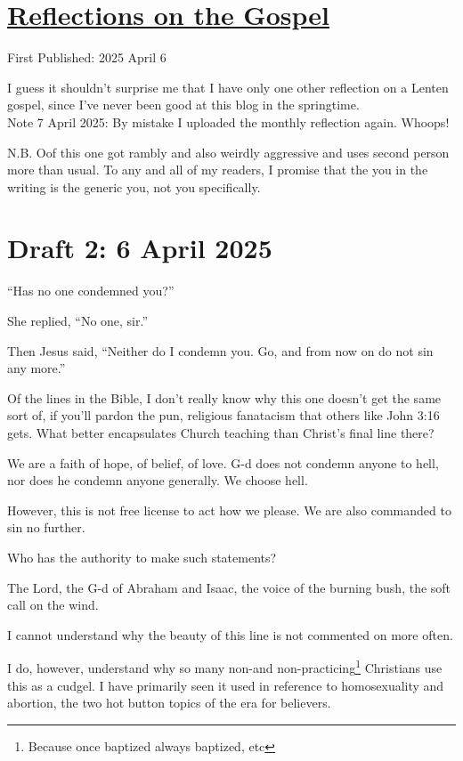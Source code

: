 \documentclass[12pt]{article}[titlepage]
\newcommand{\say}[1]{``#1''}
\renewcommand{\,}{\textsuperscript{,}}
\begin{document}
\doublespacing
\section{\href{reflections-on-readings-5-lent-c-25.html}{Reflections on the Gospel}}
First Published: 2025 April 6

I guess it shouldn't surprise me that I have only one other reflection on a Lenten gospel, since I've never been good at this blog in the springtime.
\\Note 7 April 2025: By mistake I uploaded the monthly reflection again.
Whoops!


N.B. Oof this one got rambly and also weirdly aggressive and uses second person more than usual.  
To any and all of my readers, I promise that the you in the writing is the generic you, not you specifically.

\section{Draft 2: 6 April 2025}

\say{Has no one condemned you?}

She replied, \say{No one, sir.}

Then Jesus said, \say{Neither do I condemn you. Go, and from now on do not sin any more.}

Of the lines in the Bible, I don't really know why this one doesn't get the same sort of, if you'll pardon the pun, religious fanatacism that others like John 3:16 gets.  
What better encapsulates Church teaching than Christ's final line there?

We are a faith of hope, of belief, of love.  
G-d does not condemn anyone to hell, nor does he condemn anyone generally.  
We choose hell.

However, this is not free license to act how we please.  
We are also commanded to sin no further.

Who has the authority to make such statements?

The Lord, the G-d of Abraham and Isaac, the voice of the burning bush, the soft call on the wind.

I cannot understand why the beauty of this line is not commented on more often.

I do, however, understand why so many non-and non-practicing\footnote{Because once baptized always baptized, etc} Christians use this as a cudgel.  
I have primarily seen it used in reference to homosexuality and abortion, the two hot button topics of the era for believers.
\end{document}
